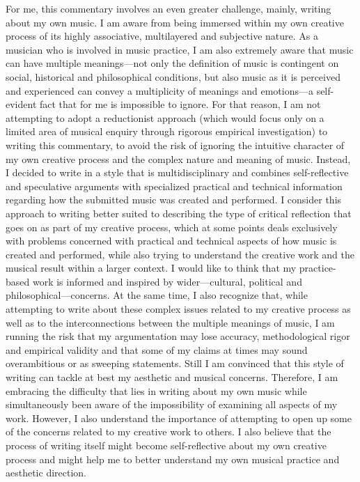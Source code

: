 For me, this commentary involves an even greater challenge, mainly, writing about my own music. I am aware from being immersed within my own creative process of its highly associative, multilayered and subjective nature.  As a musician who is involved in music practice, I am also extremely aware that music can have multiple meanings---not only the definition of music is contingent on social, historical and philosophical conditions, but also music as it is perceived and experienced can convey a multiplicity of meanings and emotions---a self-evident fact that for me is impossible to ignore. For that reason, I am not attempting to adopt a reductionist approach (which would focus only on a limited area of musical enquiry through rigorous empirical investigation) to writing this commentary, to avoid the risk of ignoring the intuitive character of my own creative process and the complex nature and meaning of music. Instead, I decided to write in a style that is multidisciplinary and combines \mbox{self-reflective} and speculative arguments with specialized practical and technical information regarding how the submitted music was created and performed. I consider this approach to writing better suited to describing the type of critical reflection that goes on as part of my creative process, which at some points deals exclusively with problems concerned with practical and technical aspects of how music is created and performed, while also trying to understand the creative work and the musical result within a larger context. I would like to think that my practice-based work is informed and inspired by wider---cultural, political and philosophical---concerns. At the same time, I also recognize that, while attempting to write about these complex issues related to my creative process as well as to the interconnections between the multiple meanings of music, I am running the risk that my argumentation may lose accuracy, methodological rigor and empirical validity and that some of my claims at times may sound overambitious or as sweeping statements. Still I am convinced that this style of writing can tackle at best my aesthetic and musical concerns. Therefore, I am embracing the difficulty that lies in writing about my own music while simultaneously been aware of the impossibility of examining all aspects of my work. However, I also understand the importance of attempting to open up some of the concerns related to my creative work to others. I also believe that the process of writing itself might become self-reflective about my own creative process and might help me to better understand my own musical practice and aesthetic direction. 

